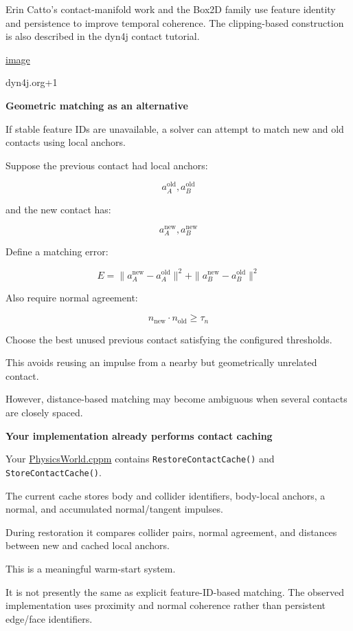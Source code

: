 Erin Catto's contact-manifold work and the Box2D family use feature identity and persistence to improve temporal coherence. The clipping-based construction is also described in the dyn4j contact tutorial. 

\href{https://www.google.com/s2/favicons?domain=https://dyn4j.org&sz=32}{image}

dyn4j.org+1

\textbf{Geometric matching as an alternative}

If stable feature IDs are unavailable, a solver can attempt to match new and old contacts using local anchors.

Suppose the previous contact had local anchors:

\[
a_A^{\mathrm{old}},a_B^{\mathrm{old}}
\]

and the new contact has:

\[
a_A^{\mathrm{new}},a_B^{\mathrm{new}}
\]

Define a matching error:

\[
\boxed{ E= \|a_A^{\mathrm{new}}-a_A^{\mathrm{old}}\|^2+ \|a_B^{\mathrm{new}}-a_B^{\mathrm{old}}\|^2 }
\]

Also require normal agreement:

\[
\boxed{ n_{\mathrm{new}}\cdot n_{\mathrm{old}}\ge\tau_n }
\]

Choose the best unused previous contact satisfying the configured thresholds.

This avoids reusing an impulse from a nearby but geometrically unrelated contact.

However, distance-based matching may become ambiguous when several contacts are closely spaced.

\textbf{Your implementation already performs contact caching}

Your \href{https://github.com/swayam8624/KairoPhysicsEngine/blob/main/PhysicsWorld.cppm?utm_source=chatgpt.com}{PhysicsWorld.cppm} contains \texttt{RestoreContactCache()} and \texttt{StoreContactCache()}.

The current cache stores body and collider identifiers, body-local anchors, a normal, and accumulated normal/tangent impulses.

During restoration it compares collider pairs, normal agreement, and distances between new and cached local anchors.

This is a meaningful warm-start system.

It is not presently the same as explicit feature-ID-based matching. The observed implementation uses proximity and normal coherence rather than persistent edge/face identifiers.

